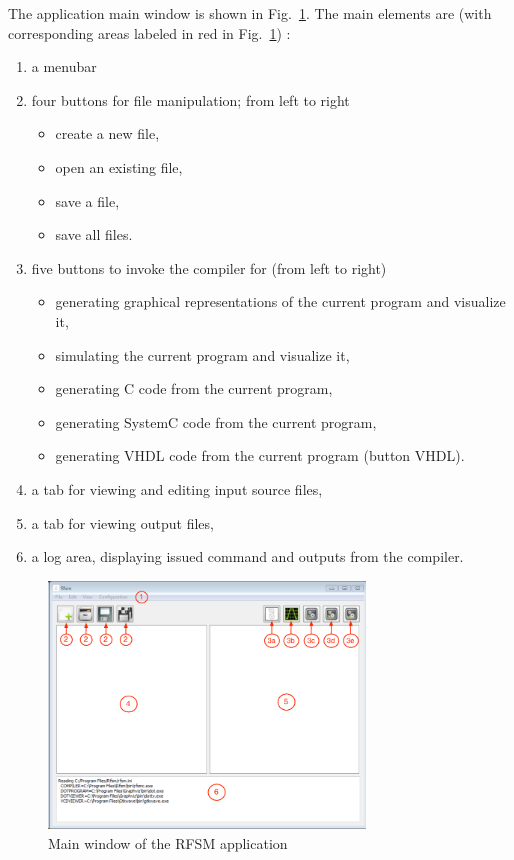 \medskip
The application main window is shown in Fig.~\ref{fig:main-window}. 
The main elements are (with corresponding areas labeled in red in Fig.~\ref{fig:main-window}) :
\begin{enumerate}
\item a menubar
\item four buttons for file manipulation; from left to right
  \begin{itemize}
  \item create a new file,
  \item open an existing file,
  \item save a file,
  \item save all files.
  \end{itemize}
\item five buttons to invoke the compiler for (from left to right)
  \begin{itemize}
  \item generating graphical representations of the current program and visualize it,
  \item simulating the current program and visualize it,
  \item generating C code from the current program,
  \item generating SystemC code from the current program,
  \item generating VHDL code from the current program (button \textsc{VHDL}).
  \end{itemize}
\item a tab for viewing and editing input source files,
\item a tab for viewing output files,
\item a log area, displaying issued command and outputs from the compiler.
\end{enumerate}

\begin{figure}[h]
  \centering
  \includegraphics[width=0.75\textwidth]{figs/gui/mainwindow}
  \caption{Main window of the RFSM application}
  \label{fig:main-window}
\end{figure}

